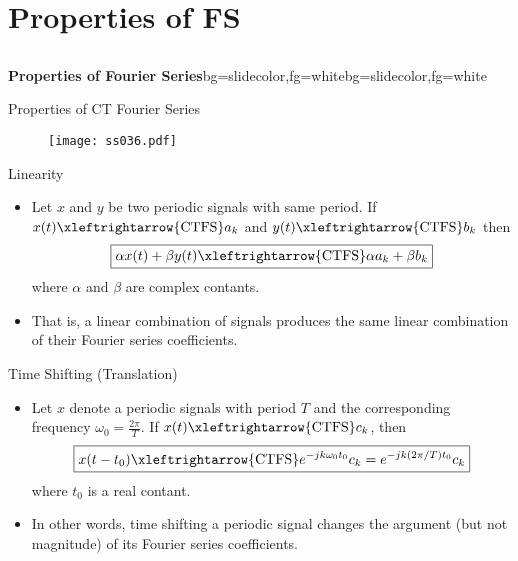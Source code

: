 \section{Properties of FS}
\subsection{}
\begin{frame}{}
\begin{variableblock}{\centering \Large \textbf{\vspace{4pt}\newline Properties of Fourier Series\vspace{4pt}}}{bg=slidecolor,fg=white}{bg=slidecolor,fg=white}
\end{variableblock}
\end{frame}

\begin{frame}{Properties of CT Fourier Series}
\begin{figure}
\centering
\texttt{[image: ss036.pdf]}
\end{figure}
\end{frame}

\begin{frame}{Linearity}
\begin{itemize}
\item Let $x$ and $y$ be two periodic signals with same period. If $x(t) \xleftrightarrow{\text{CTFS}} a_k$ and $y(t) \xleftrightarrow{\text{CTFS}} b_k$ then
\[\boxed{\alpha x(t)+\beta y(t)\xleftrightarrow{\text{CTFS}}\alpha a_k+\beta b_k}\]
where $\alpha$ and $\beta$ are complex contants.
\item That is, a linear combination of signals produces the same linear combination of their Fourier series coefficients.
\end{itemize}
\end{frame}


\begin{frame}{Time Shifting (Translation)}
\begin{itemize}
\item Let $x$ denote a periodic signals with period $T$ and the corresponding frequency $\omega_0 = \frac{2\pi}{T}$. If $x(t) \xleftrightarrow{\text{CTFS}} c_k$, then
\[\boxed{x(t-t_0)\xleftrightarrow{\text{CTFS}}e^{-jk\omega_0t_0}c_k=e^{-jk(2\pi/T)t_0}c_k}\]
where $t_0$ is a real contant.
\item In other words, time shifting a periodic signal changes the argument (but not magnitude) of its Fourier series coefficients.
\end{itemize}
\end{frame}

